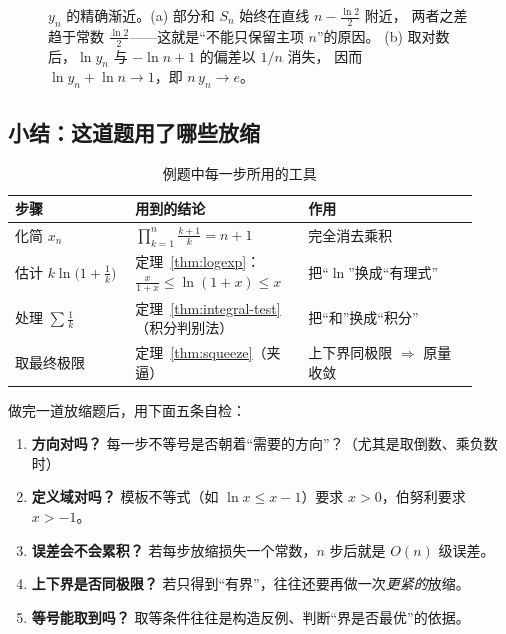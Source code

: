 \documentclass[11pt,a4paper]{ctexart}
\theoremstyle{definition}
\theoremstyle{remark}
\begin{document}
\begin{figure}[H]
  \caption{$y_n$ 的精确渐近。(a) 部分和 $S_n$ 始终在直线 $n-\frac{\ln2}{2}$ 附近，
           两者之差趋于常数 $\frac{\ln2}{2}$——这就是“不能只保留主项 $n$”的原因。
           (b) 取对数后，$\ln y_n$ 与 $-\ln n+1$ 的偏差以 $1/n$ 消失，
           因而 $\ln y_n+\ln n\to1$，即 $n\,y_n\to e$。}
  \label{fig:yn}
\end{figure}

\subsection{小结：这道题用了哪些放缩}

\begin{table}[H]
\centering
\caption{例题中每一步所用的工具}
\renewcommand{\arraystretch}{1.4}
\begin{tabular}{@{}p{0.24\linewidth}p{0.34\linewidth}p{0.34\linewidth}@{}}
\toprule
\textbf{步骤} & \textbf{用到的结论} & \textbf{作用} \\
\midrule
化简 $x_n$ & $\displaystyle\prod_{k=1}^{n}\frac{k+1}{k}=n+1$ & 完全消去乘积 \\
估计 $k\ln\big(1+\frac1k\big)$ & 定理~\ref{thm:logexp}：$\frac{x}{1+x}\le\ln(1+x)\le x$
  & 把“$\ln$”换成“有理式” \\
处理 $\sum\frac{1}{k}$ & 定理~\ref{thm:integral-test}（积分判别法） & 把“和”换成“积分” \\
取最终极限 & 定理~\ref{thm:squeeze}（夹逼） & 上下界同极限 $\Rightarrow$ 原量收敛 \\
\bottomrule
\end{tabular}
\end{table}

\begin{keybox}[放缩法的通行检查表]
做完一道放缩题后，用下面五条自检：
\begin{enumerate}[label=\arabic*.]
  \item \textbf{方向对吗？} 每一步不等号是否朝着“需要的方向”？（尤其是取倒数、乘负数时）
  \item \textbf{定义域对吗？} 模板不等式（如 $\ln x\le x-1$）要求 $x>0$，伯努利要求 $x>-1$。
  \item \textbf{误差会不会累积？} 若每步放缩损失一个常数，$n$ 步后就是 $O(n)$ 级误差。
  \item \textbf{上下界是否同极限？} 若只得到“有界”，往往还要再做一次\emph{更紧的}放缩。
  \item \textbf{等号能取到吗？} 取等条件往往是构造反例、判断“界是否最优”的依据。
\end{enumerate}
\end{keybox}
\end{document}
